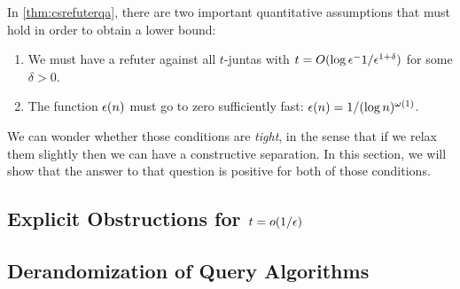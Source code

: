 In \cref{thm:csrefuterqa}, there are two important quantitative assumptions
that must hold in order to obtain a lower bound:

\begin{enumerate}
    \item We must have a refuter against all $t$-juntas with $t = O(\log \epsilon^-1 / \epsilon^{1+\delta})$ for
    some $\delta > 0$.
    \item The function $\epsilon(n)$ must go to zero sufficiently fast: $\epsilon(n) = 1/(\log n)^{\omega(1)}$.
\end{enumerate}

We can wonder whether those conditions are \emph{tight}, in the sense that if we relax them slightly 
then we can have a constructive separation. 
In this section, we will show that the answer to that question
is positive for both of those conditions. 

\subsection{Explicit Obstructions for $t = o(1/\epsilon)$}

\subsection{Derandomization of Query Algorithms}

